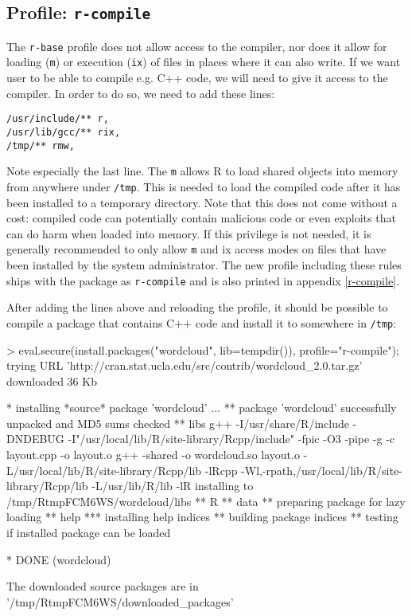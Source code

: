 \documentclass[article]{jss}
\newcommand{\R}{\textsf{R}\xspace}
\newcommand{\Cpp}{\textsf{C++}\xspace}
\begin{document}
\subsection[Profile: r-compile]{Profile: \texttt{r-compile}}

The \texttt{r-base} profile does not allow access to the compiler, nor does it
allow for loading (\texttt{m}) or execution (\texttt{ix}) of files in places
where it can also write. If we want user to be able to compile e.g.
\Cpp code, we will need to give it access to the compiler. In order
to do so, we need to add these lines:

\begin{verbatim}
/usr/include/** r,
/usr/lib/gcc/** rix,
/tmp/** rmw,
\end{verbatim}

Note especially the last line. The \texttt{m} allows \R to load shared
objects into memory from anywhere under \texttt{/tmp}. This is needed to load
the compiled code after it has been installed to a temporary directory. Note
that this does not come without a cost: compiled code can potentially contain
malicious code or even exploits that can do harm when loaded into memory. If
this privilege is not needed, it is generally recommended to only allow
\texttt{m} and {ix} access modes on files that have been installed by the
system administrator. The new profile including these rules ships with the
package as \texttt{r-compile} and is also printed in appendix \ref{r-compile}.

After adding the lines above and reloading the profile, it should be possible to
compile a package that contains \Cpp code and install it to somewhere
in \texttt{/tmp}:

\begin{CodeChunk}
\begin{CodeInput}
> eval.secure(install.packages("wordcloud", lib=tempdir()), profile="r-compile");
trying URL 'http://cran.stat.ucla.edu/src/contrib/wordcloud_2.0.tar.gz'
downloaded 36 Kb

* installing *source* package 'wordcloud' ...
** package 'wordcloud' successfully unpacked and MD5 sums checked
** libs
g++ -I/usr/share/R/include -DNDEBUG -I"/usr/local/lib/R/site-library/Rcpp/include"
   -fpic  -O3 -pipe  -g  -c layout.cpp -o layout.o
g++ -shared -o wordcloud.so layout.o -L/usr/local/lib/R/site-library/Rcpp/lib
   -lRcpp -Wl,-rpath,/usr/local/lib/R/site-library/Rcpp/lib -L/usr/lib/R/lib -lR
installing to /tmp/RtmpFCM6WS/wordcloud/libs
** R
** data
** preparing package for lazy loading
** help
*** installing help indices
** building package indices
** testing if installed package can be loaded

* DONE (wordcloud)

The downloaded source packages are in
	'/tmp/RtmpFCM6WS/downloaded_packages'
\end{CodeInput}
\end{CodeChunk}
\end{document}
